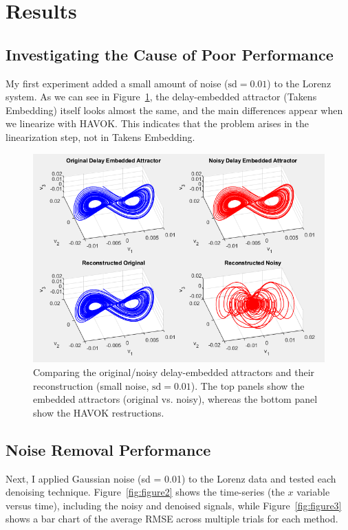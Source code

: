 \documentclass[11pt]{article}
\begin{document}
	\section{Results}
	
	\subsection{Investigating the Cause of Poor Performance}
	My first experiment added a small amount of noise (\(\text{sd} = 0.01\)) to the Lorenz system. As we can see in Figure~\ref{fig:figure1}, the delay-embedded attractor (Takens Embedding) itself looks almost the same, and the main differences appear when we linearize with HAVOK. This indicates that the problem arises in the linearization step, not in Takens Embedding.
	
	\begin{figure}[htbp]
		\centering
		\includegraphics[width=0.7\linewidth]{Figure3}
		\caption{Comparing the original/noisy delay-embedded attractors and their reconstruction (small noise, \(\text{sd}=0.01\)). The top panels show the embedded attractors (original vs. noisy), whereas the bottom panel show the HAVOK restructions.}
		\label{fig:figure1}
	\end{figure}
	
	\subsection{Noise Removal Performance}
	Next, I applied Gaussian noise (sd = 0.01) to the Lorenz data and tested each denoising technique. Figure~\ref{fig:figure2} shows the time-series (the \(x\) variable versus time), including the noisy and denoised signals, while Figure~\ref{fig:figure3} shows a bar chart of the average RMSE across multiple trials for each method.
	
\end{document}
